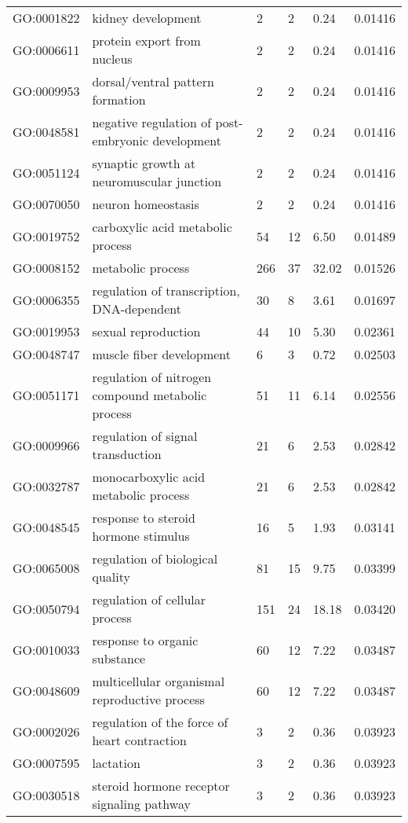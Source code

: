 \documentclass[10pt]{bmc_article}
\newenvironment{bmcformat}{\begin{raggedright}\baselineskip20pt\sloppy\setboolean{publ}{false}}{\end{raggedright}\baselineskip20pt\sloppy}
\begin{document}
\begin{bmcformat}
\begin{longtable}{lp{4.5cm}llll}
  GO:0001822 & kidney development &   2 &   2 & 0.24 & 0.01416 \\ 
  GO:0006611 & protein export from nucleus &   2 &   2 & 0.24 & 0.01416 \\ 
  GO:0009953 & dorsal/ventral pattern formation &   2 &   2 & 0.24 & 0.01416 \\ 
  GO:0048581 & negative regulation of post-embryonic development &   2 &   2 & 0.24 & 0.01416 \\ 
  GO:0051124 & synaptic growth at neuromuscular junction &   2 &   2 & 0.24 & 0.01416 \\ 
  GO:0070050 & neuron homeostasis &   2 &   2 & 0.24 & 0.01416 \\ 
  GO:0019752 & carboxylic acid metabolic process &  54 &  12 & 6.50 & 0.01489 \\ 
  GO:0008152 & metabolic process & 266 &  37 & 32.02 & 0.01526 \\ 
  GO:0006355 & regulation of transcription, DNA-dependent &  30 &   8 & 3.61 & 0.01697 \\ 
  GO:0019953 & sexual reproduction &  44 &  10 & 5.30 & 0.02361 \\ 
  GO:0048747 & muscle fiber development &   6 &   3 & 0.72 & 0.02503 \\ 
  GO:0051171 & regulation of nitrogen compound metabolic process &  51 &  11 & 6.14 & 0.02556 \\ 
  GO:0009966 & regulation of signal transduction &  21 &   6 & 2.53 & 0.02842 \\ 
  GO:0032787 & monocarboxylic acid metabolic process &  21 &   6 & 2.53 & 0.02842 \\ 
  GO:0048545 & response to steroid hormone stimulus &  16 &   5 & 1.93 & 0.03141 \\ 
  GO:0065008 & regulation of biological quality &  81 &  15 & 9.75 & 0.03399 \\ 
  GO:0050794 & regulation of cellular process & 151 &  24 & 18.18 & 0.03420 \\ 
  GO:0010033 & response to organic substance &  60 &  12 & 7.22 & 0.03487 \\ 
  GO:0048609 & multicellular organismal reproductive process &  60 &  12 & 7.22 & 0.03487 \\ 
  GO:0002026 & regulation of the force of heart contraction &   3 &   2 & 0.36 & 0.03923 \\ 
  GO:0007595 & lactation &   3 &   2 & 0.36 & 0.03923 \\ 
  GO:0030518 & steroid hormone receptor signaling pathway &   3 &   2 & 0.36 & 0.03923 \\ 

\end{longtable}
\end{bmcformat}
\end{document}
